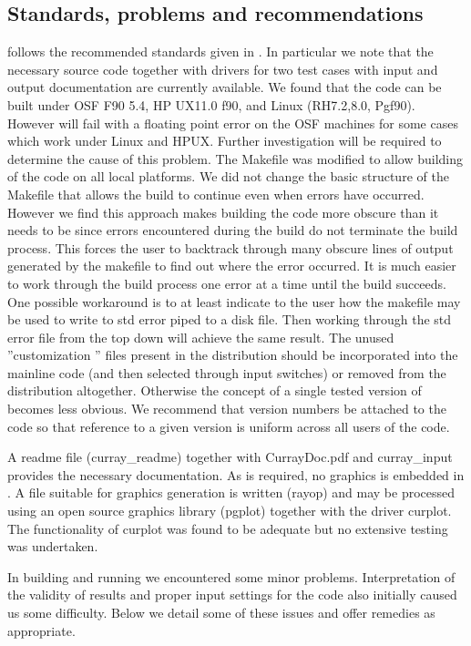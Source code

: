 \subsection{Standards, problems and recommendations} \label{prob}

\ct follows  the recommended standards given in \cite{b4}.
 In particular we note that the necessary source code together with
 drivers for two test cases with input and output documentation
 are currently available.    We found that the code can be built under
   OSF F90 5.4, HP UX11.0 f90, and Linux (RH7.2,8.0, Pgf90). 
   However \ct will fail with
   a floating point error on the OSF machines for some  cases  which
   work under Linux and HPUX. Further investigation will be required to
   determine the cause of this problem.  
The Makefile was modified to allow building of
the code on all local platforms. We  did not change the basic structure of
the Makefile that allows the build to continue even when errors have
occurred. However we find this approach makes building the code more
obscure  than it needs to be since errors encountered during the
build do not terminate the build process. This  forces the user to
backtrack  through many obscure 
lines of output generated by the makefile to find out where the
error occurred. It is much easier to work through the build process 
one error at a time until the build succeeds. One possible workaround
is to at least indicate to the user  how the makefile may be used to
write to std error piped to a disk file. Then working through the
std error file from the top down will achieve the same result.
 The unused ''customization '' files present in the distribution
 should be incorporated into the mainline code
 (and then selected through input switches) or removed from the distribution altogether. Otherwise the concept
 of a single tested version of \ct becomes less obvious.
 We recommend that 
 version  numbers be attached to the code so that reference to a
 given version is uniform across all users of the code.

 A readme file (curray\_readme) together with CurrayDoc.pdf and
 curray\_input  provides  the necessary documentation. 
 As is required, no graphics is embedded in \ct . A  file suitable
 for graphics generation is written (rayop)  and may be processed using
 an open source graphics library (pgplot) together with the driver
 curplot. The functionality of curplot was found to be adequate but no
 extensive testing was undertaken. 
  

    In building and running \ct we encountered some minor problems.
    Interpretation of the validity of  results and proper input
    settings for the code also initially caused us some difficulty.
    Below  we detail some of these issues and offer
    remedies as appropriate. 
  

